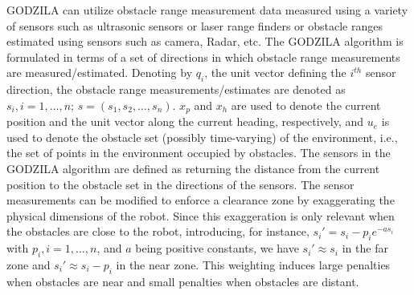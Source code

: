 \documentclass[10pt,conference]{ieeeconf}
\begin{document}
GODZILA can utilize obstacle range measurement data  measured using a variety of sensors such as
ultrasonic sensors or laser range finders or obstacle ranges estimated using
sensors such as camera, Radar, etc. The GODZILA algorithm is formulated in terms of a set of directions in which
obstacle range measurements are measured/estimated. Denoting by $q_i$, the
unit vector defining the $i^{th}$ sensor direction, the obstacle range
measurements/estimates are denoted as $s_i,i=1,\ldots,n$;
$s=(s_1,s_2,\ldots,s_n)$.
$x_p$ and $x_h$ are used to denote the current position and the unit vector
along the current heading, respectively, and
$u_e$ is used to denote the obstacle set (possibly time-varying) of the
environment, i.e., the set of points in the environment occupied by
obstacles. The sensors in the GODZILA algorithm are defined as returning the distance from the current position
to the obstacle set in the directions of the sensors. 
The sensor
measurements can be modified to enforce a clearance zone by
exaggerating the physical dimensions of the robot.  Since this
exaggeration is only relevant when the obstacles are close to the robot,
introducing, for instance,  
$s_i'=s_i-p_i e^{-a s_i}$
with $p_i,i=1,\ldots,n$, and $a$ being positive constants, we have
$s_i'\approx s_i$
in the far zone and 
$s_i'\approx s_i-p_i$
  in the near zone.   This weighting induces large
penalties when obstacles are near and small penalties when obstacles
are distant.  
\end{document}
